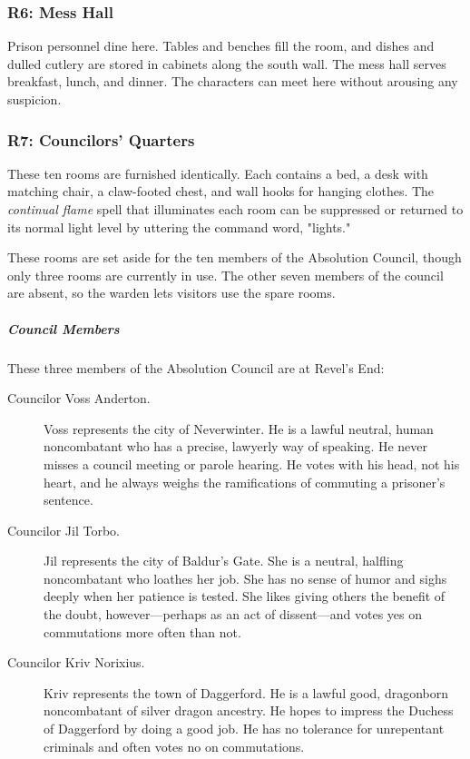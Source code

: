 \documentclass[10pt,a4paper,twoside,bg=print,twocolumn,openany,nodeprecatedcode]{dndbook}
\begin{document}
\subsubsection{R6: Mess Hall}
Prison personnel dine here. Tables and benches fill the room, and dishes and dulled cutlery are stored in cabinets along the south wall. The mess hall serves breakfast, lunch, and dinner. The characters can meet here without arousing any suspicion.

\subsubsection{R7: Councilors' Quarters}
These ten rooms are furnished identically. Each contains a bed, a desk with matching chair, a claw-footed chest, and wall hooks for hanging clothes. The \textit{continual flame} spell that illuminates each room can be suppressed or returned to its normal light level by uttering the command word, "lights."

These rooms are set aside for the ten members of the Absolution Council, though only three rooms are currently in use. The other seven members of the council are absent, so the warden lets visitors use the spare rooms.

\subparagraph{Council Members}
These three members of the Absolution Council are at Revel's End:


\begin{description}
\item[Councilor Voss Anderton.]
Voss represents the city of Neverwinter. He is a lawful neutral, human noncombatant who has a precise, lawyerly way of speaking. He never misses a council meeting or parole hearing. He votes with his head, not his heart, and he always weighs the ramifications of commuting a prisoner's sentence.
\item[Councilor Jil Torbo.]
Jil represents the city of Baldur's Gate. She is a neutral, halfling noncombatant who loathes her job. She has no sense of humor and sighs deeply when her patience is tested. She likes giving others the benefit of the doubt, however—perhaps as an act of dissent—and votes yes on commutations more often than not.
\item[Councilor Kriv Norixius.]
Kriv represents the town of Daggerford. He is a lawful good, dragonborn noncombatant of silver dragon ancestry. He hopes to impress the Duchess of Daggerford by doing a good job. He has no tolerance for unrepentant criminals and often votes no on commutations.
\end{description}
\end{document}
